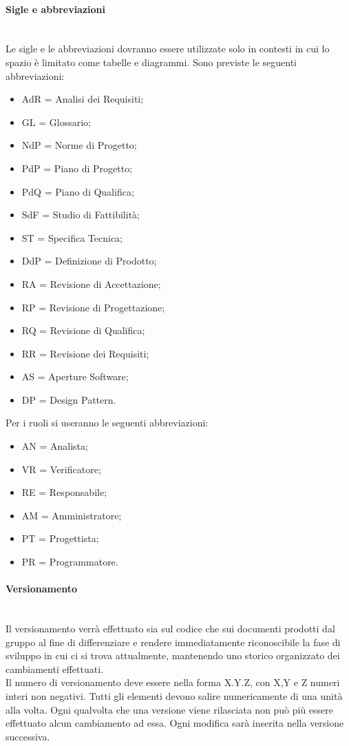 \paragraph{Sigle e abbreviazioni} \hfill \\
\label{5.5}
Le sigle e le abbreviazioni dovranno essere utilizzate solo in contesti in cui lo spazio è limitato come tabelle e diagrammi. Sono previste le seguenti abbreviazioni:
\begin{itemize}
\item AdR = Analisi dei Requisiti;
\item GL = Glossario;
\item NdP = Norme di Progetto;
\item PdP = Piano di Progetto;
\item PdQ = Piano di Qualifica;
\item SdF = Studio di Fattibilità;
\item ST = Specifica Tecnica;
\item DdP = Definizione di Prodotto;
\item RA = Revisione di Accettazione;
\item RP = Revisione di Progettazione;
\item RQ = Revisione di Qualifica;
\item RR = Revisione dei Requisiti;
\item AS = Aperture Software;
\item DP = Design Pattern.
\end{itemize}
Per i ruoli si useranno le seguenti abbreviazioni:
\begin{itemize}
\item AN = Analista;
\item VR = Verificatore;
\item RE = Responsabile;
\item AM = Amministratore;
\item PT = Progettista;
\item PR = Programmatore.
\end{itemize}


\newpage
\paragraph{Versionamento} \hfill \\
\label{6.0}
Il versionamento verrà effettuato sia sul codice che sui documenti prodotti dal gruppo al fine di differenziare e rendere immediatamente riconoscibile la fase di sviluppo in cui ci si trova attualmente, mantenendo uno storico organizzato dei cambiamenti effettuati.\\
Il numero di versionamento deve essere nella forma X.Y.Z, con X,Y e Z numeri interi non negativi. Tutti gli elementi devono salire numericamente di una unità alla volta.
Ogni qualvolta che una versione viene rilasciata non può più essere effettuato alcun cambiamento ad essa. Ogni modifica sarà inserita nella versione successiva.


